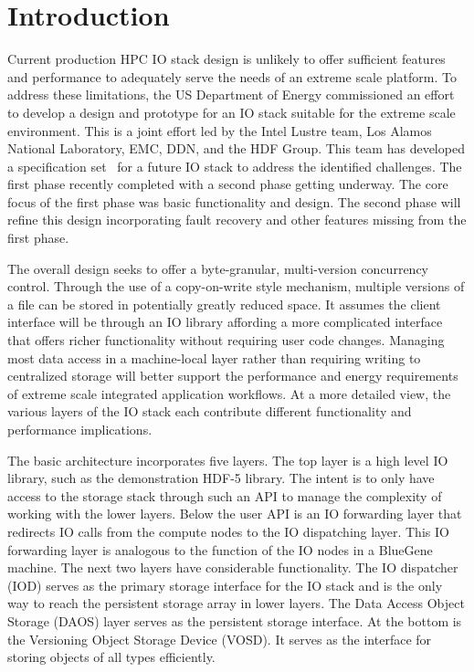 \documentclass[conference]{IEEEtran}
\begin{document}


\section{Introduction}

Current production HPC IO stack design is unlikely to offer sufficient features
and performance to adequately serve the needs of an extreme scale platform. To
address these limitations, the US Department of Energy commissioned an effort
to develop a design and prototype for an IO stack suitable for the extreme
scale environment. This is a joint effort led by the Intel Lustre team, Los
Alamos National Laboratory, EMC, DDN, and the HDF Group. This team has
developed a specification set~\cite{fastforward:2014:docs} for a future IO
stack to address the identified challenges. The first phase recently completed
with a second phase getting underway. The core focus of the first phase was
basic functionality and design. The second phase will refine this design
incorporating fault recovery and other features missing from the first phase.

The overall design seeks to offer a byte-granular, multi-version concurrency
control. Through the use of a copy-on-write style mechanism, multiple versions
of a file can be stored in potentially greatly reduced space. It assumes the
client interface will be through an IO library affording a more complicated
interface that offers richer functionality without requiring user code changes.
Managing most data access in a machine-local layer rather than requiring
writing to centralized storage will better support the performance and energy
requirements of extreme scale integrated application workflows. At a more
detailed view, the various layers of the IO stack each contribute different
functionality and performance implications.

The basic architecture incorporates five layers. The top layer is a high level
IO library, such as the demonstration HDF-5 library. The intent is to only have
access to the storage stack through such an API to manage the complexity of
working with the lower layers. Below the user API is an IO forwarding layer
that redirects IO calls from the compute nodes to the IO dispatching layer.
This IO forwarding layer is analogous to the function of the IO nodes in a
BlueGene machine. The next two layers have considerable functionality. The IO
dispatcher (IOD) serves as the primary storage interface for the IO stack and
is the only way to reach the persistent storage array in lower layers. The
Data Access Object Storage (DAOS) layer serves as the persistent storage
interface. At the bottom is the Versioning Object Storage Device (VOSD). It
serves as the interface for storing objects of all types efficiently.
\end{document}
